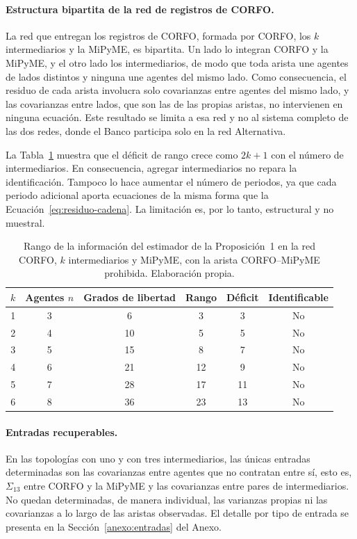 \paragraph{Estructura bipartita de la red de registros de CORFO.}
La red que entregan los registros de CORFO, formada por CORFO, los $k$ intermediarios y la MiPyME, es bipartita. Un lado lo integran CORFO y la MiPyME, y el otro lado los intermediarios, de modo que toda arista une agentes de lados distintos y ninguna une agentes del mismo lado. Como consecuencia, el residuo de cada arista involucra solo covarianzas entre agentes del mismo lado, y las covarianzas entre lados, que son las de las propias aristas, no intervienen en ninguna ecuación. Este resultado se limita a esa red y no al sistema completo de las dos redes, donde el Banco participa solo en la red Alternativa.

La Tabla~\ref{tab:rango-bipartita} muestra que el déficit de rango crece como $2k+1$ con el número de intermediarios. En consecuencia, agregar intermediarios no repara la identificación. Tampoco lo hace aumentar el número de periodos, ya que cada periodo adicional aporta ecuaciones de la misma forma que la Ecuación~\eqref{eq:residuo-cadena}. La limitación es, por lo tanto, estructural y no muestral.

\begin{table}[htbp]
\centering
\caption[Rango de identificación en la red bipartita de CORFO]{Rango de la información del estimador de la Proposición~1 en la red CORFO, $k$ intermediarios y MiPyME, con la arista CORFO--MiPyME prohibida. Elaboración propia.}
\label{tab:rango-bipartita}
\small
\begin{tabular}{cccccc}
\hline
$k$ & Agentes $n$ & Grados de libertad & Rango & Déficit & Identificable \\
\hline
1 & 3 & 6  & 3  & 3  & No \\
2 & 4 & 10 & 5  & 5  & No \\
3 & 5 & 15 & 8  & 7  & No \\
4 & 6 & 21 & 12 & 9  & No \\
5 & 7 & 28 & 17 & 11 & No \\
6 & 8 & 36 & 23 & 13 & No \\
\hline
\end{tabular}
\end{table}

\paragraph{Entradas recuperables.}
En las topologías con uno y con tres intermediarios, las únicas entradas determinadas son las covarianzas entre agentes que no contratan entre sí, esto es, $\Sigma_{13}$ entre CORFO y la MiPyME y las covarianzas entre pares de intermediarios. No quedan determinadas, de manera individual, las varianzas propias ni las covarianzas a lo largo de las aristas observadas. El detalle por tipo de entrada se presenta en la Sección~\ref{anexo:entradas} del Anexo.

